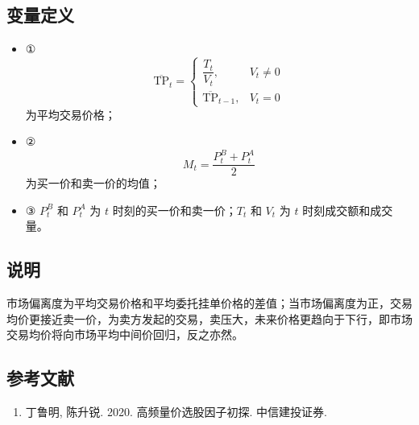 \documentclass{article}
\begin{document}
\subsection{变量定义}
\begin{itemize}
    \item ①
        \begin{equation*}
            \overline{\mathrm{TP}}_t = 
            \begin{cases} 
                \dfrac{T_t}{V_t}, & V_t \neq 0 \\[6pt]
                \overline{\mathrm{TP}}_{t-1}, & V_t = 0
            \end{cases}
        \end{equation*}
        为平均交易价格；
    \item ②
        \begin{equation*}
            M_t = \frac{P_t^B + P_t^A}{2}
        \end{equation*}
        为买一价和卖一价的均值；
    \item ③ \(P_t^B\) 和 \(P_t^A\) 为 \(t\) 时刻的买一价和卖一价；\(T_t\) 和 \(V_t\) 为 \(t\) 时刻成交额和成交量。
\end{itemize}

\subsection{说明}
市场偏离度为平均交易价格和平均委托挂单价格的差值；当市场偏离度为正，交易均价更接近卖一价，为卖方发起的交易，卖压大，未来价格更趋向于下行，即市场交易均价将向市场平均中间价回归，反之亦然。

\subsection{参考文献}
\begin{enumerate}
    \item 丁鲁明, 陈升锐. 2020. 高频量价选股因子初探. 中信建投证券.
\end{enumerate}
\end{document}
